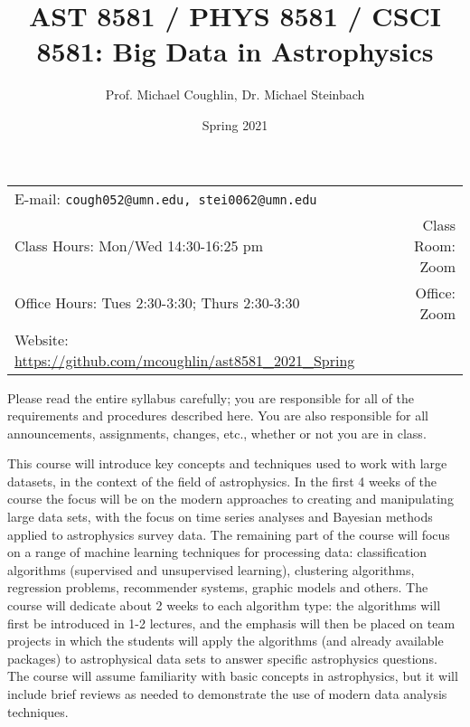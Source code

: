 \documentclass[12pt]{article}
\title{AST 8581 / PHYS 8581 / CSCI 8581: Big Data in Astrophysics}
\author{Prof. Michael Coughlin, Dr. Michael Steinbach}
\date{Spring 2021}
\newcommand{\blankline}{\quad\pagebreak[2]}
\begin{document}
\maketitle

\blankline



\begin{tabular*}{.90\textwidth}{lr}  %


E-mail: \texttt{cough052@umn.edu, stei0062@umn.edu} & \\ 
 Class Hours: Mon/Wed 14:30-16:25 pm & Class Room: Zoom \\
 Office Hours: Tues 2:30-3:30; Thurs 2:30-3:30 &  Office: Zoom \\
 Website: \url{https://github.com/mcoughlin/ast8581_2021_Spring}

&  \\
\hline
\end{tabular*}

\vspace{5 mm}

\setlength{\parindent}{2em}
\setlength{\parskip}{0.6em}
\renewcommand{\baselinestretch}{1.2}


Please read the entire syllabus carefully; you are responsible for all of the requirements and procedures described here. You are also responsible for all announcements, assignments, changes, etc., whether or not you are in class. 

This course will introduce key concepts and techniques used to work with large datasets, in the
context of the field of astrophysics. In the first 4 weeks of the course the focus will be on the modern approaches to creating and manipulating large data sets, with the focus on time series analyses and Bayesian methods applied to astrophysics survey data. The remaining part of the course will focus on a range of machine learning techniques for processing data: classification algorithms (supervised and unsupervised learning), clustering algorithms, regression problems, recommender systems, graphic models and others. The course will dedicate about 2 weeks to each algorithm type: the algorithms will first be introduced in 1-2 lectures, and the emphasis will then be placed on team projects in which the students will apply the algorithms (and already available packages) to astrophysical data sets to answer specific astrophysics questions. The course will assume familiarity with basic concepts in astrophysics, but it will include brief reviews as needed to demonstrate the use of modern data analysis techniques.
\end{document}
